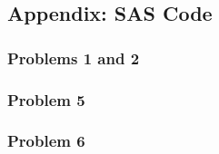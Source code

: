 \documentclass[11pt]{article}
\begin{document}
\pagebreak
\subsection*{Appendix: SAS Code}

\subsubsection*{Problems 1 and 2}

{\footnotesize}

\subsubsection*{Problem 5}

{\footnotesize}

\subsubsection*{Problem 6}

{\footnotesize}
\end{document}
